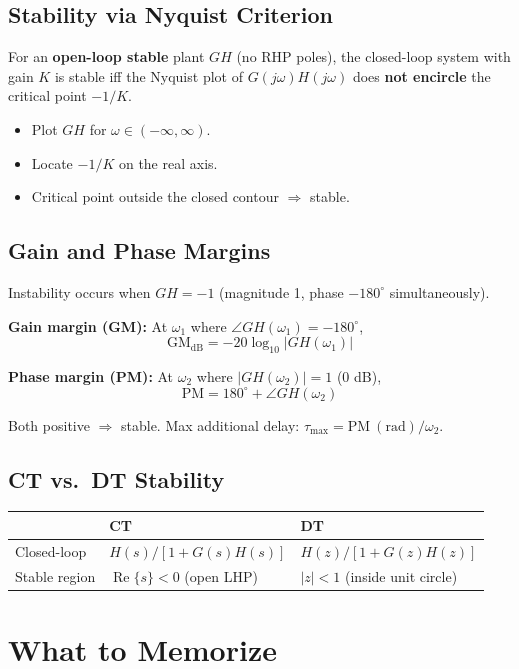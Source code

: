\documentclass{article}
\begin{document}
\subsection{Stability via Nyquist Criterion}

For an \textbf{open-loop stable} plant $GH$ (no RHP poles), the closed-loop system with gain $K$ is stable iff the Nyquist plot of $G(j\omega)H(j\omega)$ does \textbf{not encircle} the critical point $-1/K$.

\begin{itemize}
  \item Plot $GH$ for $\omega \in (-\infty, \infty)$.
  \item Locate $-1/K$ on the real axis.
  \item Critical point outside the closed contour $\Rightarrow$ stable.
\end{itemize}

\subsection{Gain and Phase Margins}

Instability occurs when $GH = -1$ (magnitude 1, phase $-180^\circ$ simultaneously).

\textbf{Gain margin (GM):} At $\omega_1$ where $\angle GH(\omega_1) = -180^\circ$,
$$\mathrm{GM}_{\mathrm{dB}} = -20\log_{10}|GH(\omega_1)|$$

\textbf{Phase margin (PM):} At $\omega_2$ where $|GH(\omega_2)| = 1$ (0 dB),
$$\mathrm{PM} = 180^\circ + \angle GH(\omega_2)$$

Both positive $\Rightarrow$ stable. Max additional delay: $\tau_{\max} = \mathrm{PM\ (rad)}/\omega_2$.

\subsection{CT vs.\ DT Stability}

\begin{center}
\begin{tabular}{lll}
\toprule
 & CT & DT \\
\midrule
Closed-loop & $H(s)/[1+G(s)H(s)]$ & $H(z)/[1+G(z)H(z)]$ \\
Stable region & $\operatorname{Re}\{s\}<0$ (open LHP) & $|z|<1$ (inside unit circle) \\
\bottomrule
\end{tabular}
\end{center}

\section{What to Memorize}
\end{document}
